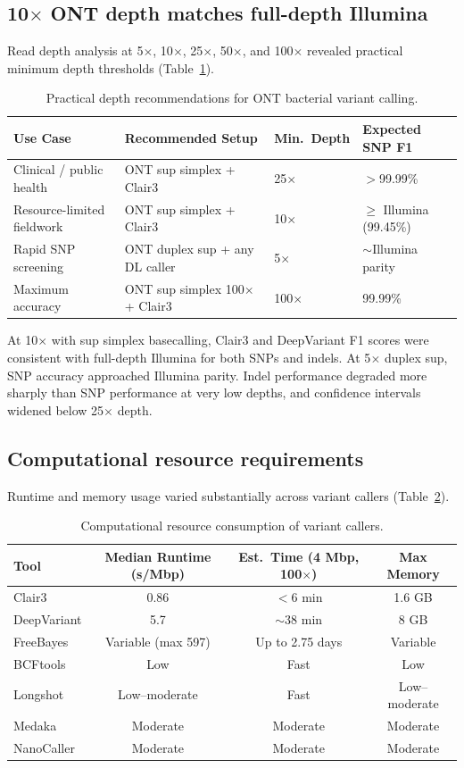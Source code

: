 \documentclass[11pt]{article}
\begin{document}
\subsection{10$\times$ ONT depth matches full-depth Illumina}

Read depth analysis at 5$\times$, 10$\times$, 25$\times$, 50$\times$, and 100$\times$ revealed practical minimum depth thresholds (Table~\ref{tab:depth}).

\begin{table}[ht]
\centering
\caption{Practical depth recommendations for ONT bacterial variant calling.}
\label{tab:depth}
\begin{tabular}{llll}
\toprule
Use Case & Recommended Setup & Min.\ Depth & Expected SNP F1 \\
\midrule
Clinical / public health & ONT sup simplex + Clair3 & 25$\times$ & $>$99.99\% \\
Resource-limited fieldwork & ONT sup simplex + Clair3 & 10$\times$ & $\geq$ Illumina (99.45\%) \\
Rapid SNP screening & ONT duplex sup + any DL caller & 5$\times$ & $\sim$Illumina parity \\
Maximum accuracy & ONT sup simplex 100$\times$ + Clair3 & 100$\times$ & 99.99\% \\
\bottomrule
\end{tabular}
\end{table}

At 10$\times$ with sup simplex basecalling, Clair3 and DeepVariant F1 scores were consistent with full-depth Illumina for both SNPs and indels. At 5$\times$ duplex sup, SNP accuracy approached Illumina parity. Indel performance degraded more sharply than SNP performance at very low depths, and confidence intervals widened below 25$\times$ depth.

\subsection{Computational resource requirements}

Runtime and memory usage varied substantially across variant callers (Table~\ref{tab:resources}).

\begin{table}[ht]
\centering
\caption{Computational resource consumption of variant callers.}
\label{tab:resources}
\begin{tabular}{lccc}
\toprule
Tool & Median Runtime (s/Mbp) & Est.\ Time (4 Mbp, 100$\times$) & Max Memory \\
\midrule
Clair3 & 0.86 & $<$6 min & 1.6 GB \\
DeepVariant & 5.7 & $\sim$38 min & 8 GB \\
FreeBayes & Variable (max 597) & Up to 2.75 days & Variable \\
BCFtools & Low & Fast & Low \\
Longshot & Low--moderate & Fast & Low--moderate \\
Medaka & Moderate & Moderate & Moderate \\
NanoCaller & Moderate & Moderate & Moderate \\
\bottomrule
\end{tabular}
\end{table}
\end{document}

